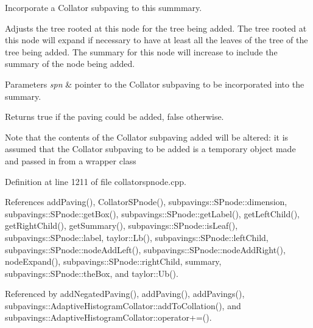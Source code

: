 \-Incorporate a \-Collator subpaving to this summmary. 

\-Adjusts the tree rooted at this node for the tree being added. \-The tree rooted at this node will expand if necessary to have at least all the leaves of the tree of the tree being added. \-The summary for this node will increase to include the summary of the node being added.


\begin{DoxyParams}{\-Parameters}
{\em spn} & pointer to the \-Collator subpaving to be incorporated into the summary. \\
\hline
\end{DoxyParams}
\begin{DoxyReturn}{\-Returns}
true if the paving could be added, false otherwise. 
\end{DoxyReturn}
\begin{DoxyNote}{\-Note}
that the contents of the \-Collator subpaving added will be altered\-: it is assumed that the \-Collator subpaving to be added is a temporary object made and passed in from a wrapper class 
\end{DoxyNote}


\-Definition at line 1211 of file collatorspnode.\-cpp.



\-References add\-Paving(), \-Collator\-S\-Pnode(), subpavings\-::\-S\-Pnode\-::dimension, subpavings\-::\-S\-Pnode\-::get\-Box(), subpavings\-::\-S\-Pnode\-::get\-Label(), get\-Left\-Child(), get\-Right\-Child(), get\-Summary(), subpavings\-::\-S\-Pnode\-::is\-Leaf(), subpavings\-::\-S\-Pnode\-::label, taylor\-::\-Lb(), subpavings\-::\-S\-Pnode\-::left\-Child, subpavings\-::\-S\-Pnode\-::node\-Add\-Left(), subpavings\-::\-S\-Pnode\-::node\-Add\-Right(), node\-Expand(), subpavings\-::\-S\-Pnode\-::right\-Child, summary, subpavings\-::\-S\-Pnode\-::the\-Box, and taylor\-::\-Ub().



\-Referenced by add\-Negated\-Paving(), add\-Paving(), add\-Pavings(), subpavings\-::\-Adaptive\-Histogram\-Collator\-::add\-To\-Collation(), and subpavings\-::\-Adaptive\-Histogram\-Collator\-::operator+=().



